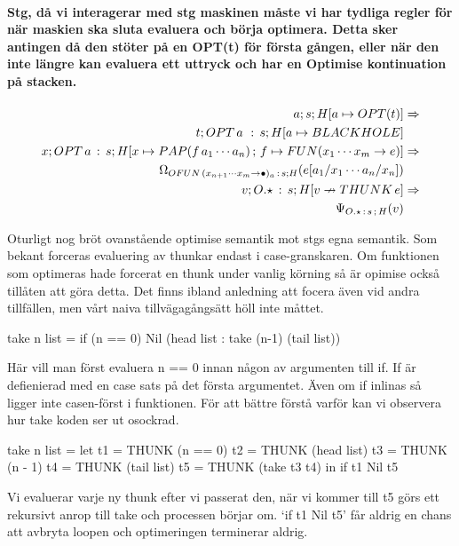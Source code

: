 \documentclass[../Optimise]{subfiles}
\begin{document}
\paragraph*{Stg, då vi interagerar med stg maskinen måste vi har tydliga regler
för när maskien ska sluta evaluera och börja optimera. Detta sker
antingen då den stöter på en OPT(t) för första gången, eller när den
inte längre kan evaluera ett uttryck och har en Optimise kontinuation
på stacken.}

\begin{align*}
a;s;H[a\mapsto OPT(t)] & \Rightarrow\\
t;OPT\,a\,\,:\,s;H[a\mapsto BLACKHOLE]\\
x;OPT\,a\,:\,s;H[x\mapsto PAP(f\,a_{1}\cdots a_{n})\,;\,f\mapsto FUN(x_{1}\cdots x_{m}\to e)] & \Rightarrow\\
\Omega_{OFUN\,(x_{n+1}\cdots x_{m}\to\bullet)_{a}\,:\,s;H}(e[a_{1}/x_{1}\cdots a_{n}/x_{n}])\\
v;O.\star\,:\, s;H[v\nrightarrow THUNK\,e] & \Rightarrow\\
\Psi_{O.\star\,:\, s\,;\,H}(v)\end{align*}


Oturligt nog bröt ovanstående optimise semantik mot stgs egna semantik. Som bekant forceras evaluering av thunkar endast i case-granskaren. Om funktionen som optimeras hade forcerat en
thunk under vanlig körning så är opimise också tillåten att göra detta. Det finns ibland anledning att focera även vid andra tillfällen, men vårt naiva tillvägagångsätt höll inte måttet.

\begin{codeEx}
        take n list = if (n == 0) Nil (head list : take (n-1) (tail list))
\end{codeEx}
Här vill man först evaluera n == 0 innan någon av argumenten till if.
If är defienierad med en case sats på det första argumentet. Även om
if inlinas så ligger inte casen-först i funktionen. För att bättre förstå varför kan vi observera hur take koden ser ut osockrad. 

\begin{codeEx}
  take n list = let t1 = THUNK (n == 0)
                    t2 = THUNK (head list)
                    t3 = THUNK (n - 1)
                    t4 = THUNK (tail list)
                    t5 = THUNK (take t3 t4)
                in  if t1 Nil t5
\end{codeEx}

Vi evaluerar varje ny thunk efter vi passerat den, när vi kommer till t5 görs ett rekursivt anrop till take och processen börjar om. `if t1 Nil t5' får aldrig en chans att avbryta loopen och optimeringen terminerar aldrig.
\end{document}
